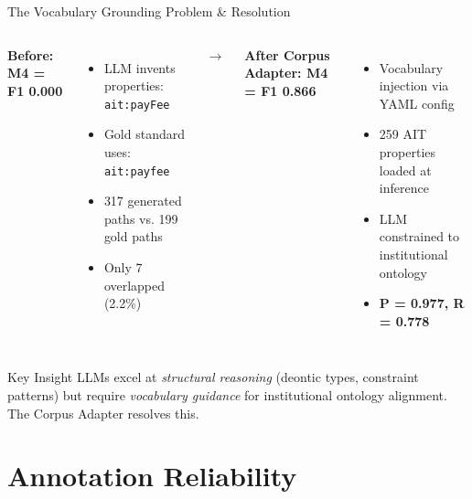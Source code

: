 \documentclass[aspectratio=169, 10pt]{beamer}
\begin{document}
\begin{frame}{The Vocabulary Grounding Problem \& Resolution}
    \begin{columns}
        \textbf{Before: M4 = F1 0.000}
        \begin{itemize}
            \item LLM invents properties: \texttt{ait:payFee}
            \item Gold standard uses: \texttt{ait:payfee}
            \item 317 generated paths vs. 199 gold paths
            \item Only 7 overlapped (2.2\%)
        \end{itemize}
        
        \centering
        \Huge$\rightarrow$
        
        \textbf{After Corpus Adapter: M4 = F1 0.866}
        \begin{itemize}
            \item Vocabulary injection via YAML config
            \item 259 AIT properties loaded at inference
            \item LLM constrained to institutional ontology
            \item \textbf{P = 0.977, R = 0.778}
        \end{itemize}
    \end{columns}
    
    \vspace{0.5cm}
    \begin{alertblock}{Key Insight}
        LLMs excel at \textit{structural reasoning} (deontic types, constraint patterns) but require \textit{vocabulary guidance} for institutional ontology alignment. The Corpus Adapter resolves this.
    \end{alertblock}
\end{frame}

\section{Annotation Reliability}
\end{document}
